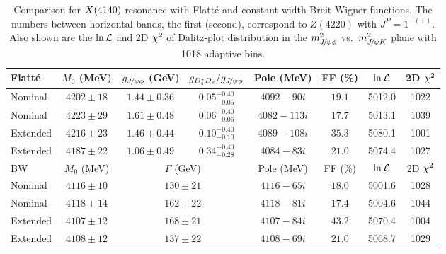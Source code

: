\begin{table}[hbtp]
\centering
\caption{Comparison for $X(4140)$ resonance with Flatt\'e and constant-width Breit-Wigner functions. 
The numbers between horizontal bands, the first (second), correspond to $Z(4220)$ with $J^P=1^{-(+)}$.  
Also shown are the $\ln\mathcal{L}$  and 2D $\chi^2$ of Dalitz-plot distribution in the $m^2_{{{J\mskip -3mu/\mskip -2mu\psi}}\phi}$ vs.\ $m^2_{{{J\mskip -3mu/\mskip -2mu\psi}} K}$ plane with 1018 adaptive bins.}\label{tab:flatte}
\small{
\begin{tabular}{lccccccc}\hline
Flatt\'e&  $M_0$ (MeV)& $g_{{{J\mskip -3mu/\mskip -2mu\psi}}\phi}$ (GeV)& $g_{D_s^*D_s}/g_{{{J\mskip -3mu/\mskip -2mu\psi}}\phi}$ & Pole (MeV)&FF (\%)& $\ln\mathcal{L}$& 2D $\chi^2$\\\hline
Nominal & $  4202 \pm    18 $ & $  1.44 \pm  0.36 $ & $  0.05_{-0.05}^{+0.40} $  & $4092 - 90 i$ & $  19.1 $ &  5012.0 & 1022\\
Nominal & $  4223 \pm    29 $ & $  1.61 \pm  0.48 $ & $  0.06_{-0.06}^{+0.40} $ & $4082 - 113 i$ & $  17.7 $ &  5013.1 & 1039\\ 
\hline
Extended & $  4216 \pm   23 $ & $  1.46 \pm  0.44 $ & $  0.10_{-0.10}^{+0.40} $ & $4089 - 108 i$& $  35.3 $ &  5080.1 & 1001\\ 
Extended & $  4187 \pm   22 $ & $  1.06 \pm  0.49 $ & $  0.34_{-0.28}^{+0.40} $ & $4084 - 83 i$& $  21.0 $ &  5074.4 & 1027\\ 

\hline\hline
BW&  $M_0$ (MeV)& \multicolumn{2}{c}{$\Gamma$ (GeV)}& Pole (MeV) &FF (\%)& $\ln\mathcal{L}$  & 2D $\chi^2$\\\hline
Nominal & $  4116\pm 10 $ & \multicolumn{2}{c}{$   130 \pm 21 $} & $  4116 -    65 i $ & $  18.0 $ &  5001.6 & 1028\\ 
Nominal & $  4118\pm 14 $ & \multicolumn{2}{c}{$   162 \pm 22 $} & $  4118 -    81 i $ & $  17.4 $ &  5004.6 & 1044 \\ \hline
Extended & $  4107\pm 12 $ & \multicolumn{2}{c}{$   168 \pm 21 $} & $  4107 -    84 i $ & $  43.2 $ &  5070.4  & 1004\\ 
Extended & $  4108\pm 12 $ & \multicolumn{2}{c}{$   137 \pm 22 $} & $  4108 -    69 i $ & $  21.0 $ &  5068.7 & 1029\\ 
 
\hline
\end{tabular}
}
\end{table}

